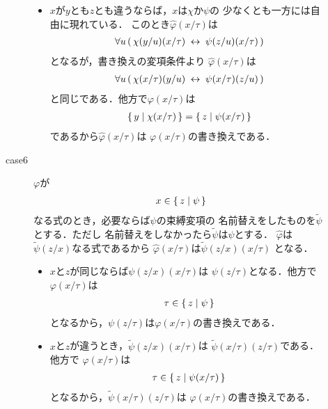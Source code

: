 \begin{metaprf}
\begin{description}
\begin{description}
\begin{itemize}
							\item $x$が$y$とも$z$とも違うならば，$x$は$\chi$か$\psi$の
								少なくとも一方には自由に現れている．
								このとき$\widehat{\varphi}(x/\tau)$は
								\begin{align}
									\forall u\, (\, \chi(y/u)(x/\tau) \hspace{0.25em}\leftrightarrow\hspace{0.25em} \psi(z/u)(x/\tau)\, )
								\end{align}
								となるが，書き換えの変項条件より
								$\widehat{\varphi}(x/\tau)$は
								\begin{align}
									\forall u\, (\, \chi(x/\tau)(y/u) \hspace{0.25em}\leftrightarrow\hspace{0.25em} \psi(x/\tau)(z/u)\, )
								\end{align}
								と同じである．他方で$\varphi(x/\tau)$は
								\begin{align}
									\{\, y \mid \chi(x/\tau)\, \} = \{\, z \mid \psi(x/\tau)\, \}
								\end{align}
								であるから$\widehat{\varphi}(x/\tau)$は
								$\varphi(x/\tau)$の書き換えである．
						\end{itemize}
						
					\item[case6] $\varphi$が
						\begin{align}
							x \in \{\, z \mid \psi\, \}
						\end{align}
						なる式のとき，必要ならば$\psi$の束縛変項の
						名前替えをしたものを$\widetilde{\psi}$とする．ただし
						名前替えをしなかったら$\widetilde{\psi}$は$\psi$とする．
						$\widehat{\varphi}$は$\widetilde{\psi}(z/x)$なる式であるから
						$\widehat{\varphi}(x/\tau)$は$\tilde{\psi}(z/x)(x/\tau)$
						となる．
						\begin{itemize}
							\item $x$と$z$が同じならば$\psi(z/x)(x/\tau)$は
								$\psi(z/\tau)$となる．他方で$\varphi(x/\tau)$は
								\begin{align}
									\tau \in \{\, z \mid \psi\, \}
								\end{align}
								となるから，$\psi(z/\tau)$は$\varphi(x/\tau)$の書き換えである．
								
							\item $x$と$z$が違うとき，$\widetilde{\psi}(z/x)(x/\tau)$は
								$\widetilde{\psi}(x/\tau)(z/\tau)$である．他方で
								$\varphi(x/\tau)$は
								\begin{align}
									\tau \in \{\, z \mid \psi(x/\tau)\, \}
								\end{align}
								となるから，$\widetilde{\psi}(x/\tau)(z/\tau)$は
								$\varphi(x/\tau)$の書き換えである．
						\end{itemize}
						

\end{description}
\end{description}
\end{metaprf}
